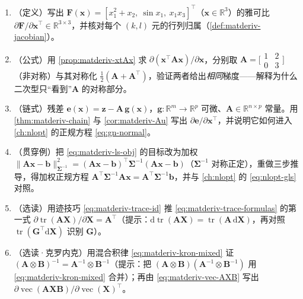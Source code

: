 \begin{practice}
\begin{enumerate}
  \item （定义）写出 $\mathbf{F}(\mathbf{x})=[x_1^2+x_2,\ \sin x_1,\ x_1 x_3]^\top$（$\mathbf{x}\in\mathbb{R}^3$）的雅可比 $\partial\mathbf{F}/\partial\mathbf{x}^\top\in\mathbb{R}^{3\times3}$，并核对每个 $(k,l)$ 元的行列归属（\cref{def:matderiv-jacobian}）。
  \item （公式）用 \cref{prop:matderiv-xtAx} 求 $\partial(\mathbf{x}^\top\mathbf{A}\mathbf{x})/\partial\mathbf{x}$，分别取 $\mathbf{A}=\big[\begin{smallmatrix}1&2\\0&3\end{smallmatrix}\big]$（非对称）与其对称化 $\tfrac12(\mathbf{A}+\mathbf{A}^\top)$，验证两者给出\emph{相同}梯度——解释为什么二次型只“看到”$\mathbf{A}$ 的对称部分。
  \item （链式）残差 $\mathbf{e}(\mathbf{x})=\mathbf{z}-\mathbf{A}\,\mathbf{g}(\mathbf{x})$，$\mathbf{g}:\mathbb{R}^m\to\mathbb{R}^p$ 可微、$\mathbf{A}\in\mathbb{R}^{n\times p}$ 常量。用 \cref{thm:matderiv-chain} 与 \cref{cor:matderiv-Au} 写出 $\partial\mathbf{e}/\partial\mathbf{x}^\top$，并说明它如何进入 \cref{ch:nlopt} 的正规方程 \cref{eq:gn-normal}。
  \item （贯穿例）把 \cref{eq:matderiv-ls-obj} 的目标改为加权 $\|\mathbf{A}\mathbf{x}-\mathbf{b}\|_{\boldsymbol{\Sigma}^{-1}}^2=(\mathbf{A}\mathbf{x}-\mathbf{b})^\top\boldsymbol{\Sigma}^{-1}(\mathbf{A}\mathbf{x}-\mathbf{b})$（$\boldsymbol{\Sigma}^{-1}$ 对称正定），重做三步推导，得加权正规方程 $\mathbf{A}^\top\boldsymbol{\Sigma}^{-1}\mathbf{A}\mathbf{x}=\mathbf{A}^\top\boldsymbol{\Sigma}^{-1}\mathbf{b}$，并与 \cref{ch:nlopt} 的 \cref{eq:nlopt-gls} 对照。
  \item （选读）用迹技巧 \cref{eq:matderiv-trace-id} 推 \cref{eq:matderiv-trace-formulas} 的第一式 $\partial\operatorname{tr}(\mathbf{A}\mathbf{X})/\partial\mathbf{X}=\mathbf{A}^\top$（提示：$\mathrm{d}\operatorname{tr}(\mathbf{A}\mathbf{X})=\operatorname{tr}(\mathbf{A}\,\mathrm{d}\mathbf{X})$，再对照 $\operatorname{tr}(\mathbf{G}^\top\mathrm{d}\mathbf{X})$ 识别 $\mathbf{G}$）。
  \item （选读·克罗内克）用混合积律 \cref{eq:matderiv-kron-mixed} 证 $(\mathbf{A}\otimes\mathbf{B})^{-1}=\mathbf{A}^{-1}\otimes\mathbf{B}^{-1}$（提示：把 $(\mathbf{A}\otimes\mathbf{B})(\mathbf{A}^{-1}\otimes\mathbf{B}^{-1})$ 用 \cref{eq:matderiv-kron-mixed} 合并）；再由 \cref{eq:matderiv-vec-AXB} 写出 $\partial\operatorname{vec}(\mathbf{A}\mathbf{X}\mathbf{B})/\partial\operatorname{vec}(\mathbf{X})^\top$。

\end{enumerate}
\end{practice}
